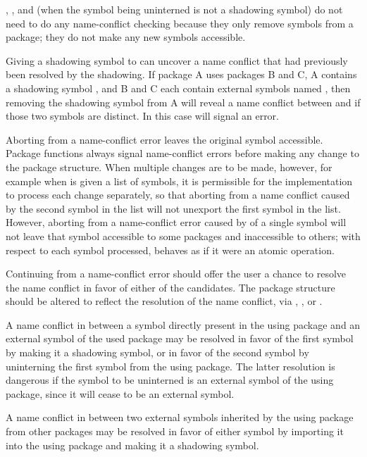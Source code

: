 , , and  (when the symbol being
uninterned is not a shadowing symbol) do not need to do any
name-conflict checking because they only remove symbols from a package;
they do not make any new symbols accessible.

Giving a shadowing symbol to  can uncover a name conflict that had
previously been resolved by the shadowing.  If package A uses packages
B and C, A contains a shadowing symbol , and B and C each contain external
symbols named , then removing the shadowing symbol 
from A will reveal a name
conflict between  and  if those two symbols are distinct.
In this case  will signal an error.

Aborting from a name-conflict error leaves the original symbol accessible.
Package functions always signal name-conflict errors before making any
change to the package structure.  When multiple changes are to be made,
however, for example when  is given a list of symbols, it is
permissible for the implementation to process each change separately,
so that aborting from a name
conflict caused by the second symbol in the list will not unexport the
first symbol in the list.  However, aborting from a name-conflict error
caused by  of a single symbol will not leave that symbol accessible
to some packages and inaccessible to others; with respect to
each symbol processed, 
behaves as if it were an atomic operation.

Continuing from a name-conflict error should offer the user a chance to
resolve the name conflict in favor of either of the candidates.  The
package structure should be altered to reflect the resolution of the
name conflict, via , , or .

A name conflict in  between a symbol directly present in the
using package and an external symbol of the used package may be resolved
in favor of the first symbol by making it a shadowing symbol, or in favor
of the second symbol by uninterning the first symbol from the using
package.  The latter resolution is dangerous if the symbol to be
uninterned is an external symbol of the using package, since it
will cease to be an external symbol.

A name conflict in  between two external symbols inherited
by the using package from other packages may be resolved in favor of
either symbol by importing it into the using package and making it a
shadowing symbol.

